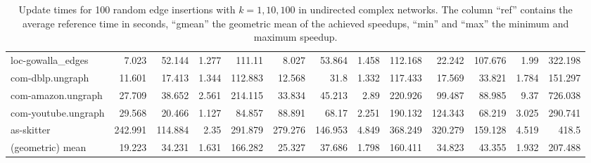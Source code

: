 \begin{landscape}
\begin{table}[h]
\begin{tabular}{l|rrrr|rrrr|rrrr}
 loc-gowalla\_edges    &   7.023 &  52.144 & 1.277 & 111.11  &   8.027 &  53.864 & 1.458 & 112.168 &  22.242 & 107.676 & 1.99  & 322.198 \\
 com-dblp.ungraph     &  11.601 &  17.413 & 1.344 & 112.883 &  12.568 &  31.8   & 1.332 & 117.433 &  17.569 &  33.821 & 1.784 & 151.297 \\
 com-amazon.ungraph   &  27.709 &  38.652 & 2.561 & 214.115 &  33.834 &  45.213 & 2.89  & 220.926 &  99.487 &  88.985 & 9.37  & 726.038 \\
 com-youtube.ungraph  &  29.568 &  20.466 & 1.127 &  84.857 &  88.891 &  68.17  & 2.251 & 190.132 & 124.343 &  68.219 & 3.025 & 290.741 \\
 as-skitter           & 242.991 & 114.884 & 2.35  & 291.879 & 279.276 & 146.953 & 4.849 & 368.249 & 320.279 & 159.128 & 4.519 & 418.5   \\ \midrule \midrule
 (geometric) mean     &  19.223 &  34.231 & 1.631 & 166.282 &  25.327 &  37.686 & 1.798 & 160.411 &  34.823 &  43.355 & 1.932 & 207.488 \\
\bottomrule
\end{tabular}

\caption{Update times for 100 random edge insertions with $k = 1, 10, 100$ in undirected complex networks.  The column ``ref'' contains the average reference time in seconds, ``gmean'' the geometric mean of the achieved speedups, ``min'' and ``max'' the minimum and maximum speedup.}
\label{tbl:topkUndirectedComplex}
\end{table}
\end{landscape}


